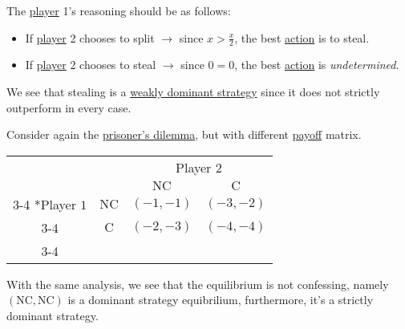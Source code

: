 \begin{eg}
	The \hyperref[def:player]{player} 1's reasoning should be as follows:
	\begin{itemize}
		\item If \hyperref[def:player]{player} 2 chooses to split \(\to \) since \(x>\frac{x}{2}\), the best \hyperref[def:strategy]{action} is to steal.
		\item If \hyperref[def:player]{player} 2 chooses to steal \(\to \) since \(0=0\), the best \hyperref[def:strategy]{action} is \emph{undetermined}.
	\end{itemize}

	We see that stealing is a \hyperref[def:weakly-dominant-strategy]{weakly dominant strategy} since it does not strictly outperform in every case.
\end{eg}

\begin{eg}\label{eg:prisoner-dilemma-ver2}
	Consider again the \hyperref[eg:prisoner-dilemma]{prisoner's dilemma}, but with different \hyperref[def:reward]{payoff} matrix.
	\begin{table}[H]
		\centering
		\setlength{\extrarowheight}{2pt}
		\begin{tabular}{cc|c|c|}
			                          & \multicolumn{1}{c}{} & \multicolumn{2}{c}{Player $2$}                                       \\
			                          & \multicolumn{1}{c}{} & \multicolumn{1}{c}{$\mathrm{NC}$} & \multicolumn{1}{c}{$\mathrm{C}$} \\\cline{3-4}
			\multirow{2}*{Player $1$} & $\mathrm{NC}$        & $(-1, -1)$                        & $(-3, -2)$                       \\\cline{3-4}
			                          & $\mathrm{C}$         & $(-2, -3)$                        & $(-4, -4)$                       \\\cline{3-4}
		\end{tabular}
	\end{table}
	With the same analysis, we see that the equilibrium is not confessing, namely \((\mathrm{NC}, \mathrm{NC})\) is a dominant strategy equibrilium, furthermore, it's a strictly dominant strategy.
\end{eg}


